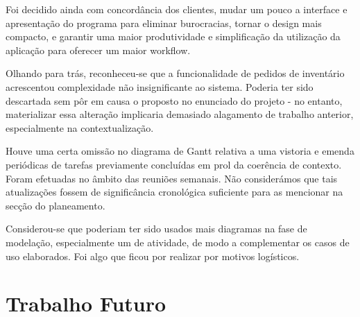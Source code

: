         Foi decidido ainda com concordância dos clientes, mudar um pouco a interface e apresentação do programa para eliminar burocracias, tornar o design mais compacto, e garantir uma maior produtividade e simplificação da utilização da aplicação para oferecer um maior workflow.
        
        Olhando para trás, reconheceu-se que a funcionalidade de pedidos de inventário acrescentou complexidade não insignificante ao sistema. Poderia ter sido descartada sem pôr em causa o proposto no enunciado do projeto - no entanto, materializar essa alteração implicaria demasiado alagamento de trabalho anterior, especialmente na contextualização. 
        
        Houve uma certa omissão no diagrama de Gantt relativa a uma vistoria e emenda periódicas de tarefas previamente concluídas em prol da coerência de contexto. Foram efetuadas no âmbito das reuniões semanais. Não considerámos que tais atualizações fossem de significância cronológica suficiente para as mencionar na secção do planeamento.

        Considerou-se que poderiam ter sido usados mais diagramas na fase de modelação, especialmente um de atividade, de modo a complementar os casos de uso elaborados. Foi algo que ficou por realizar por motivos logísticos.
    
    \section{Trabalho Futuro}

        
